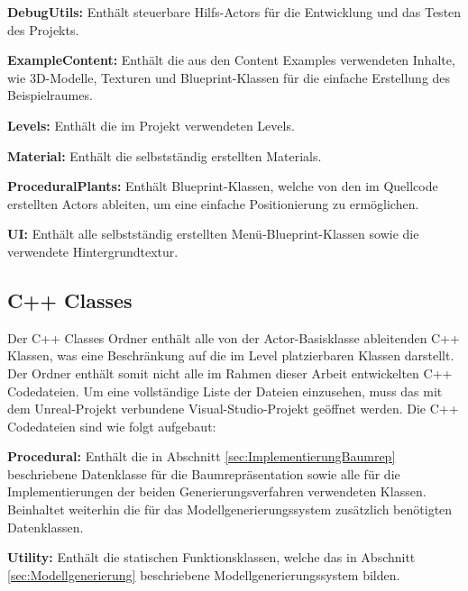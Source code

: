 \begin{description}
	\item \textbf{DebugUtils: } Enthält steuerbare Hilfs-Actors für die Entwicklung und das Testen des Projekts. \\
	
	\item \textbf{ExampleContent: } Enthält die aus den Content Examples \cite{UnrealContentExamples:17} verwendeten Inhalte, wie 3D-Modelle, Texturen und Blueprint-Klassen für die einfache Erstellung des Beispielraumes. \\
	
	\item \textbf{Levels: } Enthält die im Projekt verwendeten Levels. \\
	
	\item \textbf{Material: } Enthält die selbstständig erstellten Materials. \\
	
	\item \textbf{ProceduralPlants: } Enthält Blueprint-Klassen, welche von den im Quellcode erstellten Actors ableiten, um eine einfache Positionierung zu ermöglichen.\\
	
	\item \textbf{UI: } Enthält alle selbstständig erstellten Menü-Blueprint-Klassen sowie die verwendete Hintergrundtextur. \\
\end{description}

\subsection{C++ Classes}

Der C++ Classes Ordner enthält alle von der Actor-Basisklasse ableitenden C++ Klassen, was eine Beschränkung auf die im Level platzierbaren Klassen darstellt. Der Ordner enthält somit nicht alle im Rahmen dieser Arbeit entwickelten C++ Codedateien. Um eine vollständige Liste der Dateien einzusehen, muss das mit dem Unreal-Projekt verbundene Visual-Studio-Projekt geöffnet werden. Die C++ Codedateien sind wie folgt aufgebaut:

\begin{description}
	\item \textbf{Procedural: } Enthält die in Abschnitt \ref{sec:ImplementierungBaumrep} beschriebene Datenklasse für die Baumrepräsentation sowie alle für die Implementierungen der beiden Generierungsverfahren verwendeten Klassen. Beinhaltet weiterhin die für das Modellgenerierungssystem zusätzlich benötigten Datenklassen.\\
	
	\item \textbf{Utility: } Enthält die statischen Funktionsklassen, welche das in Abschnitt \ref{sec:Modellgenerierung} beschriebene Modellgenerierungssystem bilden. \\
\end{description}

